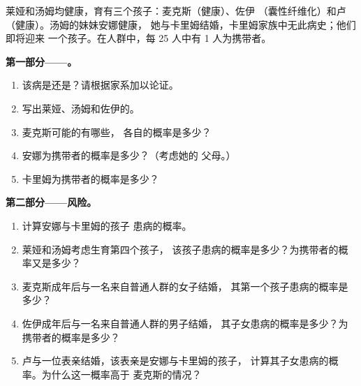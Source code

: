 \begin{problem}
\label{pb:g11:genes-and-disease:1}
莱娅和汤姆均健康，育有三个孩子：麦克斯（健康）、佐伊
（囊性纤维化）和卢（健康）。汤姆的妹妹安娜健康，
她与卡里姆结婚，卡里姆家族中无此病史；他们即将迎来
一个孩子。在人群中，每 25 人中有 1 人为携带者。

\medskip
\noindent\textbf{第一部分——。}
\begin{enumerate}
  \item 该病是还是？请根据家系加以论证。
  \item 写出莱娅、汤姆和佐伊的。
  \item 麦克斯可能的有哪些，
        各自的概率是多少？
  \item 安娜为携带者的概率是多少？（考虑她的
        父母。）
  \item 卡里姆为携带者的概率是多少？
\end{enumerate}

\medskip
\noindent\textbf{第二部分——风险。}
\begin{enumerate}[resume]
  \item 计算安娜与卡里姆的孩子
        患病的概率。
  \item 莱娅和汤姆考虑生育第四个孩子，
        该孩子患病的概率是多少？为携带者的概率又是多少？
  \item 麦克斯成年后与一名来自普通人群的女子结婚，
        其第一个孩子患病的概率是多少？
  \item 佐伊成年后与一名来自普通人群的男子结婚，
        其子女患病的概率是多少？为携带者的概率是多少？
  \item 卢与一位表亲结婚，该表亲是安娜与卡里姆的孩子，
        计算其子女患病的概率。为什么这一概率高于
        麦克斯的情况？
\end{enumerate}


\end{problem}
